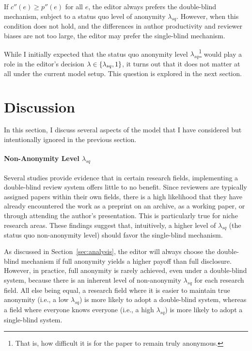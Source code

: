 \documentclass[12pt]{article}
\begin{document}
\begin{proposition}
    If $c''(e) \geq p''(e)$ for all $e$, the editor always prefers the double-blind mechanism, subject to a status quo level of anonymity $\lambda_{sq}$. However, when this condition does not hold, and the differences in author productivity and reviewer biases are not too large, the editor may prefer the single-blind mechanism.
\end{proposition}

While I initially expected that the status quo anonymity level
$\lambda_{sq}$\footnote{That is, how difficult it is for the paper to remain
    truly anonymous.} would play a role in the editor's decision $\lambda \in
    \left\{\lambda_{sq}, 1\right\}$, it turns out that it does not matter at all under the
current model setup. This question is explored in the next section.

\section{Discussion}
In this section, I discuss several aspects of the model that I have considered
but intentionally ignored in the previous section.

\paragraph{Non-Anonymity Level $\lambda_{sq}$}
Several studies provide evidence that in certain research fields, implementing a double-blind review system offers little to no benefit. Since reviewers are typically assigned papers within their own fields, there is a high likelihood that they have already encountered the work as a preprint on an archive, as a working paper, or through attending the author's presentation. This is particularly true for niche research areas. These findings suggest that, intuitively, a higher level of $\lambda_{sq}$ (the status quo non-anonymity level) should favor the single-blind mechanism.

As discussed in Section~\ref{sec:analysis}, the editor will always choose the
double-blind mechanism if full anonymity yields a higher payoff than full
disclosure. However, in practice, full anonymity is rarely achieved, even under
a double-blind system, because there is an inherent level of non-anonymity
$\lambda_{sq}$ for each research field. All else being equal, a research field
where it is easier to maintain true anonymity (i.e., a low $\lambda_{sq}$) is
more likely to adopt a double-blind system, whereas a field where everyone
knows everyone (i.e., a high $\lambda_{sq}$) is more likely to adopt a
single-blind system.
\end{document}

